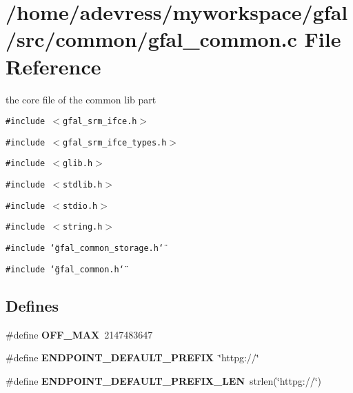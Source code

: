 \section{/home/adevress/myworkspace/gfal/src/common/gfal\_\-common.c File Reference}
\label{gfal__common_8c}
the core file of the common lib part 

{\tt \#include $<$gfal\_\-srm\_\-ifce.h$>$}\par
{\tt \#include $<$gfal\_\-srm\_\-ifce\_\-types.h$>$}\par
{\tt \#include $<$glib.h$>$}\par
{\tt \#include $<$stdlib.h$>$}\par
{\tt \#include $<$stdio.h$>$}\par
{\tt \#include $<$string.h$>$}\par
{\tt \#include \char`\"{}gfal\_\-common\_\-storage.h\char`\"{}}\par
{\tt \#include \char`\"{}gfal\_\-common.h\char`\"{}}\par
\subsection*{Defines}
\begin{CompactItemize}
\item 
\#define \textbf{OFF\_\-MAX}~2147483647\label{gfal__common_8c_616a28e950e9272a02aa05e39154d50e}

\item 
\#define \textbf{ENDPOINT\_\-DEFAULT\_\-PREFIX}~\char`\"{}httpg://\char`\"{}\label{gfal__common_8c_0bb77a5d8a45b2679d2c1784e5ac2686}

\item 
\#define \textbf{ENDPOINT\_\-DEFAULT\_\-PREFIX\_\-LEN}~strlen(\char`\"{}httpg://\char`\"{})\label{gfal__common_8c_fb26b505193c80088cceb0cdf63cc257}

\end{CompactItemize}
